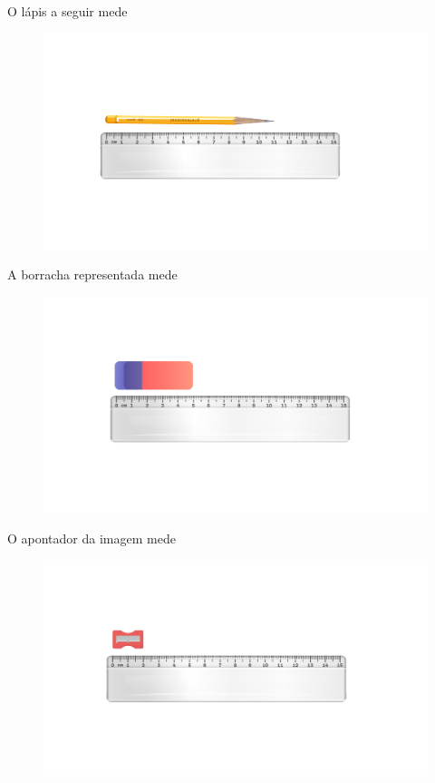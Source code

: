 \begin{escolha}
\item O lápis a seguir mede \reduline{11 cm}

\begin{figure}[htpb!]
\includegraphics[width=\textwidth]{../ilustracoes/MAT5/SAEB_5ANO_MAT_figura7.png}
\end{figure}

\item A borracha representada mede \reduline{5 cm}

\begin{figure}[htpb!]
\includegraphics[width=\textwidth]{../ilustracoes/MAT5/SAEB_5ANO_MAT_figura8.png}
\end{figure}

\item O apontador da imagem mede \reduline{3 cm}

\begin{figure}[htpb!]
\includegraphics[width=\textwidth]{../ilustracoes/MAT5/SAEB_5ANO_MAT_figura9.png}
\end{figure}


\end{escolha}
